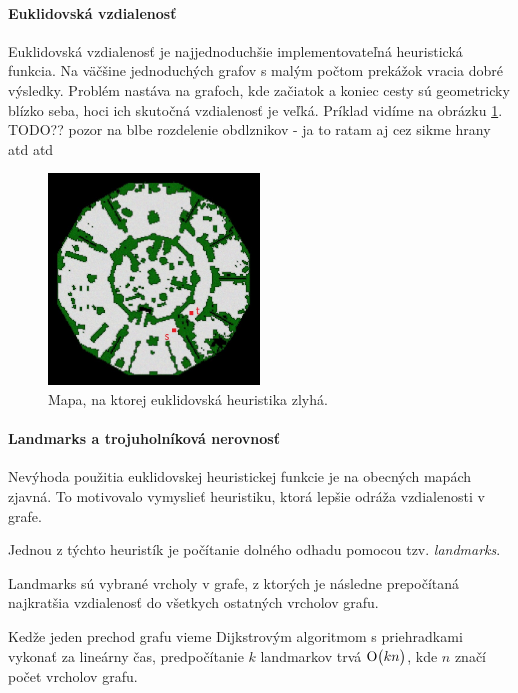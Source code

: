 \paragraph{Euklidovská vzdialenosť}

Euklidovská vzdialenosť je najjednoduchšie implementovateľná heuristická funkcia. Na väčšine jednoduchých grafov s malým počtom prekážok vracia dobré výsledky. Problém nastáva na grafoch, kde začiatok a koniec cesty sú geometricky blízko seba, hoci ich skutočná vzdialenosť je veľká.
Príklad vidíme na obrázku \ref{fig:antieuclid}.
TODO?? pozor na blbe rozdelenie obdlznikov - ja to ratam 
aj cez sikme hrany atd atd


\begin{figure}[h]
\centering
\includegraphics[width=0.5\textwidth]{./img/antieuclid505d.jpg}
\caption{Mapa, na ktorej euklidovská heuristika zlyhá.}
\label{fig:antieuclid}
\end{figure}


\paragraph{Landmarks a trojuholníková nerovnosť}
Nevýhoda použitia euklidovskej heuristickej funkcie je na obecných mapách zjavná. To motivovalo vymyslieť heuristiku, ktorá lepšie odráža vzdialenosti v grafe.

Jednou z týchto heuristík je počítanie dolného odhadu pomocou tzv. {\sl landmarks}. 

Landmarks sú vybrané vrcholy v grafe, z ktorých je následne prepočítaná najkratšia vzdialenosť do všetkych ostatných
vrcholov grafu. 



Kedže jeden prechod grafu vieme Dijkstrovým algoritmom s priehradkami vykonať za lineárny čas, predpočítanie $ k $ landmarkov trvá $ \operatorname{O}\bigl(kn\bigr) $, kde $n$ značí počet vrcholov grafu.


